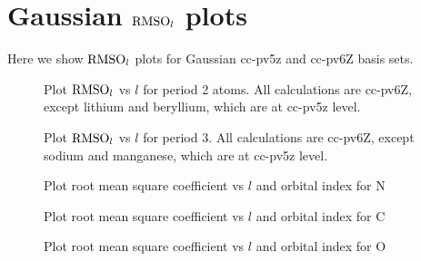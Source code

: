 \chapter{Gaussian $\text{RMSO}_l$ plots}
\label{apx:GaussianUHF}

Here we show $\text{RMSO}_l$ plots for Gaussian cc-pv5z and cc-pv6Z basis sets.

\begin{figure}
	\centering
	\caption{Plot $\text{RMSO}_l$ vs $l$ for period 2 atoms. All calculations are cc-pv6Z,
	except lithium and beryllium, which are at cc-pv5z level.}
	\label{fig:RMSO_period2_l}
\end{figure}

\begin{figure}
	\centering
	\caption{Plot $\text{RMSO}_l$ vs $l$ for period 3. All calculations are cc-pv6Z,
	except sodium and manganese, which are at cc-pv5z level.}
	\label{fig:RMSO_period3_l}
\end{figure}

\begin{figure}
	\centering
	\caption{Plot root mean square coefficient vs $l$ and orbital index for N}
	\label{fig:RMSLF_N_Gauss}
\end{figure}

\begin{figure}
	\centering
	\caption{Plot root mean square coefficient vs $l$ and orbital index for C}
	\label{fig:RMSLF_C_Gauss}
\end{figure}

\begin{figure}
	\centering
	\caption{Plot root mean square coefficient vs $l$ and orbital index for O}
	\label{fig:RMSLF_O_Gauss}
\end{figure}


